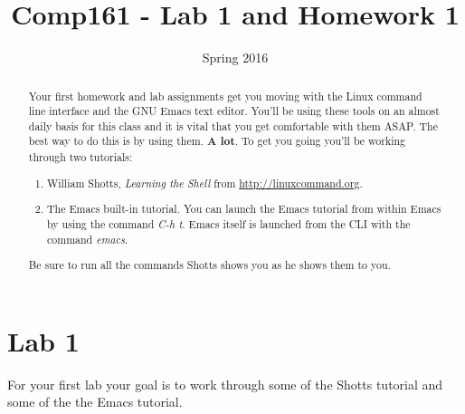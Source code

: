 \documentclass[]{tufte-handout}
\title{Comp161 - Lab 1 and Homework 1}
\author{}
\date{ Spring 2016 }
\begin{document}
\maketitle

\begin{abstract}
Your first homework and lab assignments get you moving with the Linux command line interface and the GNU Emacs text editor.  You'll be using these tools on an almost daily basis for this class and it is vital that you get comfortable with them ASAP. The best way to do this is by using them.  \textbf{A lot}. To get you going you'll be working through two tutorials:
\begin{enumerate}
\item William Shotts, \textit{Learning the Shell} from \url{http://linuxcommand.org}.
\item The Emacs built-in tutorial. You can launch the Emacs tutorial from within Emacs by using the command \textit{C-h t}.  Emacs itself is launched from the CLI with the command \textit{emacs}.
\end{enumerate}
Be sure to run all the commands Shotts shows you as he shows them to you. 
\end{abstract}


\section{Lab 1}

For your first lab your goal is to work through some of the  Shotts tutorial and some of the the Emacs tutorial. 
\end{document}
